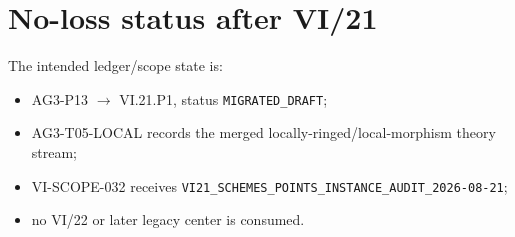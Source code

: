 \section*{No-loss status after VI/21}
The intended ledger/scope state is:
\begin{itemize}
\item AG3-P13 $\to$ VI.21.P1, status \texttt{MIGRATED\_DRAFT};
\item AG3-T05-LOCAL records the merged locally-ringed/local-morphism theory stream;
\item VI-SCOPE-032 receives
\texttt{VI21\_SCHEMES\_POINTS\_INSTANCE\_AUDIT\_2026-08-21};
\item no VI/22 or later legacy center is consumed.
\end{itemize}
